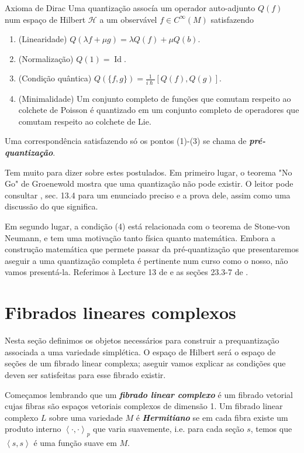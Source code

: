 \begin{thing5}{Axioma de Dirac}\leavevmode
Uma quantização assocía um operador auto-adjunto $Q(f)$ num espaço de Hilbert $\mathcal{H}$ a um observável $f \in C^\infty(M)$ satisfazendo
\begin{enumerate}
\item (Linearidade) $Q(\lambda f + \mu g)=\lambda Q(f)+\mu Q(b)$.
\item (Normalização) $Q(1)=\operatorname{Id}$.
\item (Condição quântica) $Q(\{f,g\})=\frac{1}{i\hslash}[Q(f),Q(g)]$.
\item (Minimalidade) Um conjunto completo de funções que comutam respeito ao colchete de Poisson é quantizado em um conjunto completo de operadores que comutam respeito ao colchete de Lie.
\end{enumerate}
\end{thing5}
Uma correspondência satisfazendo só os pontos (1)-(3) se chama de \textit{\textbf{pré-quantização}}.

Tem muito para dizer sobre estes postulados. Em primeiro lugar, o teorema "No Go" de Groenewold mostra que uma quantização não pode existir. O leitor pode consultar  \cite{hallq}, sec. 13.4 para um enunciado preciso e a prova dele, assim como uma discussão do que significa.

Em segundo lugar, a condição (4) está relacionada com o teorema de Stone-von Neumann, e tem uma motivação tanto física quanto matemática. Embora a construção matemática que permete passar da pré-quantização que presentaremos aseguir a uma quantização completa é pertinente num curso como o nosso, não vamos presentá-la. Referimos à Lecture 13 de \cite{wang} e as seções 23.3-7 de \cite{hallq}.

\section{Fibrados lineares complexos} 

Nesta seção definimos os objetos necessários para construir a prequantização associada a uma variedade simplética. O espaço de Hilbert será o espaço de seções de um fibrado linear complexa; aseguir vamos explicar as condições que deven ser satisfeitas para esse fibrado existir.

Começamos lembrando que um \textit{\textbf{fibrado linear complexo}} é um fibrado vetorial cujas fibras são espaços vetoriais complexos de dimensão 1. Um fibrado linear complexo $L$ sobre uma variedade $M$ é \textit{\textbf{Hermitiano}} se em cada fibra existe um produto interno $\left<\cdot,\cdot\right>_p$ que varia suavemente, i.e. para cada seção $s$, temos que $\left<s,s\right>$ é uma função suave em $M$.

